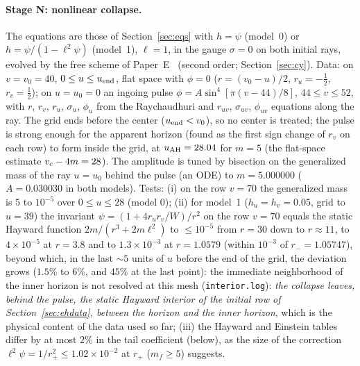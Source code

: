 \documentclass[11pt]{article}
\begin{document}
\paragraph{Stage N: nonlinear collapse.} The equations are those of Section~\ref{sec:eqs} with $h=\psi$ (model~0) or $h=\psi/(1-\ell^{2}\psi)$ (model~1), $\ell=1$, in the gauge $\sigma=0$ on both initial rays, evolved by the free scheme of Paper~E~\citep{PaperE} (second order; Section~\ref{sec:cy}). Data: on $v=v_0=40$, $0\le u\le u_{\rm end}$, flat space with $\phi=0$ ($r=(v_0-u)/2$, $r_u=-\tfrac12$, $r_v=\tfrac12$); on $u=u_0=0$ an ingoing pulse $\phi=A\sin^{4}[\pi(v-44)/8]$, $44\le v\le52$, with $r$, $r_v$, $r_u$, $\sigma_u$, $\phi_u$ from the Raychaudhuri and $r_{uv}$, $\sigma_{uv}$, $\phi_{uv}$ equations along the ray. The grid ends before the center ($u_{\rm end}<v_0$), so no center is treated; the pulse is strong enough for the apparent horizon (found as the first sign change of $r_v$ on each row) to form inside the grid, at $u_{\rm AH}=28.04$ for $m=5$ (the flat-space estimate $v_{\rm c}-4m=28$). The amplitude is tuned by bisection on the generalized mass of the ray $u=u_0$ behind the pulse (an ODE) to $m=5.000000$ ($A=0.030030$ in both models). Tests: (i) on the row $v=70$ the generalized mass is $5$ to $10^{-5}$ over $0\le u\le28$ (model 0); (ii) for model~1 ($h_u=h_v=0.05$, grid to $u=39$) the invariant $\psi=(1+4r_ur_v/W)/r^{2}$ on the row $v=70$ equals the static Hayward function $2m/(r^{3}+2m\ell^{2})$ to $\le10^{-5}$ from $r=30$ down to $r\approx11$, to $4\times10^{-5}$ at $r=3.8$ and to $1.3\times10^{-3}$ at $r=1.0579$ (within $10^{-3}$ of $r_-=1.05747$), beyond which, in the last $\sim5$ units of $u$ before the end of the grid, the deviation grows ($1.5\%$ to $6\%$, and $45\%$ at the last point): the immediate neighborhood of the inner horizon is not resolved at this mesh (\texttt{interior.log}): \emph{the collapse leaves, behind the pulse, the static Hayward interior of the initial row of Section~\ref{sec:ehdata}, between the horizon and the inner horizon}, which is the physical content of the data used so far; (iii) the Hayward and Einstein tables differ by at most $2\%$ in the tail coefficient (below), as the size of the correction $\ell^{2}\psi=1/r_+^{2}\le1.02\times10^{-2}$ at $r_+$ ($m_f\ge5$) suggests.
\end{document}

